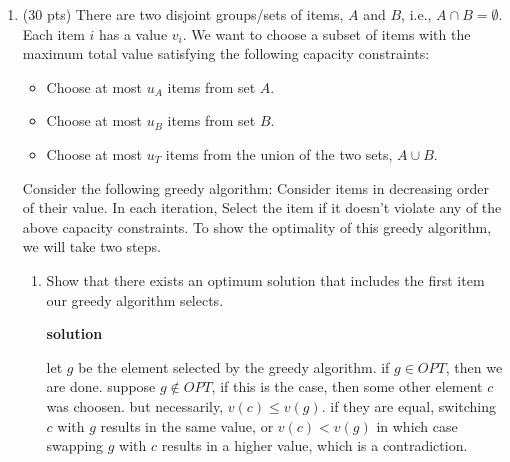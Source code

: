 \documentclass[letterpaper,12pt]{article}
\begin{document}
\begin{enumerate}
\begin{enumerate}
    \textbf{solution}

    consider n=2. meetings span from \((0,2),(1,4)\)

    greedy results in \(t=2\), picking only the first interval when the optimal is \(t=3\), picking only the second interval.

\end{enumerate}

\newpage


\item (30 pts) There are two disjoint groups/sets of items, $A$ and $B$, i.e., $A \cap B = \emptyset$. Each item $i$ has a value $v_i$. We want to choose a subset of items with the maximum total value satisfying the following capacity constraints:
\begin{itemize}
    \item Choose at most $u_A$ items from set $A$.
    \item Choose at most $u_B$ items from set $B$.
    \item Choose at most $u_T$ items from the union of the two sets, $A \cup B$.
\end{itemize}

Consider the following greedy algorithm: Consider items in decreasing order of their value. In each iteration, Select the item if it doesn't violate any of the above capacity constraints. To show the optimality of this greedy algorithm, we will take two steps.

\begin{enumerate}
    \item Show that there exists an optimum solution that includes the first item our greedy algorithm selects. 
    
    \textbf{solution}


    let \(g\) be the element selected by the greedy algorithm. if \(g\in OPT\), then we are done. suppose \(g\notin OPT\), if this is the case, then some other element \(c\) was choosen. but necessarily, \(v(c)\leq v(g)\). if they are equal, switching \(c\) with \(g\) results in the same value, or  \(v(c)< v(g)\) in which case swapping \(g\) with \(c\) results in a higher value, which is a contradiction. 




\end{enumerate}
\end{enumerate}
\end{document}

